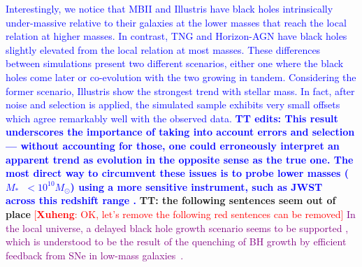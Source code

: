 \documentclass[twocolumn]{aastex631}
\newcommand{\ding}[1]{\textcolor{red}{[{\bf Xuheng}: #1]}}
\newcommand{\blue}[1]{\textcolor{blue}{#1}}
\newcommand{\yo}[1]{\textcolor{purple}{[{\bf Yohan}: #1]}}
\newcommand{\red}[1]{\textcolor{purple}{#1}}
\def\smass{{$M_*$}}
\begin{document}
\blue{
Interestingly, we notice that MBII and Illustris have black holes intrinsically under-massive relative to their galaxies at the lower masses that reach the local relation at higher masses. In contrast, TNG and Horizon-AGN have black holes slightly elevated from the local relation at most masses. These differences between simulations present two different scenarios, either one where the black holes come later or co-evolution with the two growing in tandem. Considering the former scenario, Illustris show the strongest trend with stellar mass. In fact, after noise and selection is applied, the simulated sample exhibits very small offsets which agree remarkably well with the observed data. {\bf TT edits: This result underscores the importance of taking into account errors and selection --- without accounting for those, one could erroneously interpret an apparent trend as evolution in the opposite sense as the true one.  The most direct way to circumvent these issues is to probe lower masses (\smass\  $<10^{10}M_{\odot}$) using a more sensitive instrument, such as JWST~\citep{Habouzit2022} across this redshift range \citep[see also][]{2011MNRAS.417.2085V}.}}
{\bf TT: the following sentences seem out of place} \ding{OK, let's remove the following red sentences can be removed}
\red{In the local universe, a delayed black hole growth scenario seems to be supported \citep{Reines2015}, %
which is understood to be the result of the quenching of BH growth by efficient feedback from SNe in low-mass galaxies~\citep[e.g.][]{dubois_snreg_2015,habouzit_blossom_2017,bower_dark_2017,angles_black_2017}.}




\end{document}
